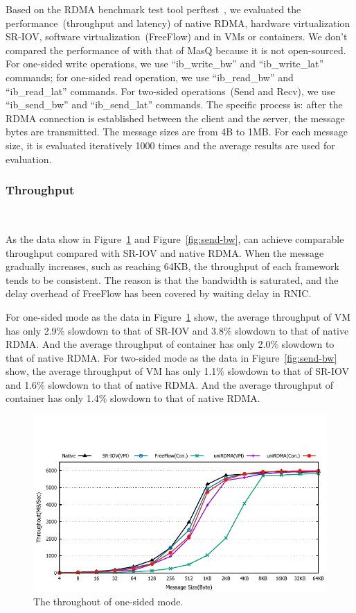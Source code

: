 Based on the RDMA benchmark test tool perftest~\cite{perftest}, we evaluated the performance~(throughput and latency) of native RDMA, hardware virtualization SR-IOV,  software virtualization~(FreeFlow) and \sys in VMs or containers. We don't compared the performance of \sys with that of MasQ because it is not open-sourced. For one-sided write operations, we use ``ib\_write\_bw'' and ``ib\_write\_lat'' commands; for one-sided read operation, we use ``ib\_read\_bw'' and ``ib\_read\_lat'' commands. For two-sided operations~(Send and Recv), we use ``ib\_send\_bw'' and ``ib\_send\_lat'' commands. The specific process is: after the RDMA connection is established between the client and the server, the message bytes are transmitted. The message sizes are from 4B to 1MB. For each message size,  it is evaluated iteratively 1000 times and the average results are used for evaluation.  

\subsubsection{\textbf{Throughput}}
\
\noindent

As the data show in Figure~\ref{fig:write-bw} and Figure~\ref{fig:send-bw}, \sys can achieve comparable throughput compared with SR-IOV and native RDMA. When the message gradually increases, such as reaching 64KB, the throughput of each framework tends to be consistent. The reason is that the bandwidth is saturated, and the delay overhead of FreeFlow has been covered by waiting delay in RNIC.

For one-sided mode as the data in Figure~\ref{fig:write-bw} show, the average throughput of \sys VM has only 2.9$\%$ slowdown to that of SR-IOV and 3.8$\%$ slowdown to that of native RDMA. And the average throughput of \sys container has only 2.0$\%$ slowdown to that of native RDMA. For two-sided mode as the data in Figure~\ref{fig:send-bw} show, the average throughput of \sys VM has only 1.1$\%$ slowdown to that of SR-IOV and 1.6$\%$ slowdown to that of native RDMA. And the average throughput of \sys container has only 1.4$\%$ slowdown to that of native RDMA.



\begin{figure}[!ht]
	\centering
	\includegraphics[width=1.0\linewidth]{images/write-bw.pdf}
	\caption{The throughout of one-sided mode.}
	\label{fig:write-bw}
\end{figure}


